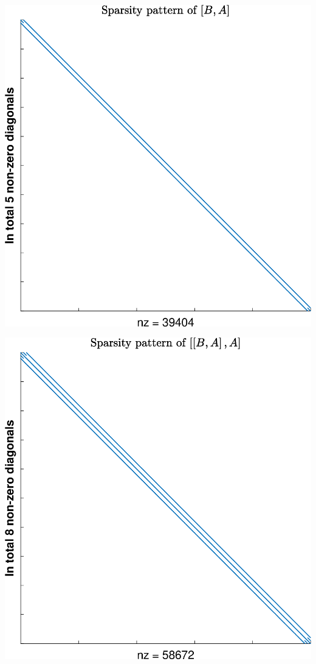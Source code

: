 \begin{minipage}[c][][c]{\linewidth}
\includegraphics[width=.95\columnwidth]{SparsityPatterns/SPP_3}
\end{minipage}
\begin{minipage}[c][][c]{\linewidth}
\includegraphics[width=.95\columnwidth]{SparsityPatterns/SPP_4}
\end{minipage}
